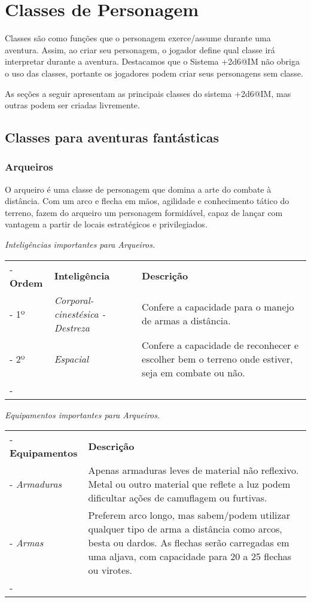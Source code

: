 \chapter{\label{ch:classes}Classes de Personagem}

Classes são como funções que o personagem exerce/assume durante uma aventura. Assim, ao criar seu personagem, o jogador define qual classe irá interpretar durante a aventura. Destacamos que o Sistema +2d6@IM não obriga o uso das classes, portante os jogadores podem criar seus personagens sem classe.

As seções a seguir apresentam as principais classes do sistema +2d6@IM, mas outras podem ser criadas livremente.


\section{\label{sec:aventMedievais}Classes para aventuras fantásticas}

\subsection*{Arqueiros}
O arqueiro é uma classe de personagem que domina a arte do combate à distância. Com um arco e flecha em mãos, agilidade e conhecimento tático do terreno, fazem do arqueiro um personagem formidável, capaz de lançar com vantagem a partir de locais estratégicos e privilegiados. 

\begin{table}[htb]
	\centering\smaller
	\emph{Inteligências importantes para Arqueiros.}
	\begin{tabu} to \textwidth {|X[c 0.5]|X[1]|X[3]|} \tabucline-
		\textbf{Ordem}	& \textbf{Inteligência}	&	\textbf{Descrição}	\\ \tabucline-
		1º		& \emph{Corporal-cinestésica - Destreza}  	& Confere a capacidade para o manejo de armas a distância.	\\ \tabucline-
		2º		& \emph{Espacial} & Confere a capacidade de reconhecer e escolher bem o terreno onde estiver, seja em combate ou não.\\ \tabucline-
	\end{tabu}
\end{table}

\begin{table}[htb]
	\centering\smaller
	\emph{Equipamentos importantes para Arqueiros.}
	\begin{tabu} to \textwidth {|X[0.5]|X[3]|} \tabucline-
		\textbf{Equipamentos}	&	\textbf{Descrição}	\\ \tabucline-
		\emph{Armaduras}  	& Apenas armaduras leves de material não reflexivo. Metal ou outro material que reflete a luz podem dificultar ações de camuflagem ou furtivas.	\\ \tabucline-
		\emph{Armas} & Preferem arco longo, mas sabem/podem utilizar qualquer tipo de arma a distância como arcos, besta ou dardos. As flechas serão carregadas em uma aljava, com capacidade para 20 a 25 flechas ou virotes.\\ \tabucline-
	\end{tabu}
\end{table}


